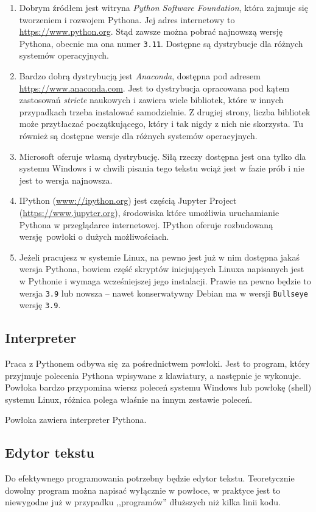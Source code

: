 \documentclass[a4paper]{article}
\begin{document}
\begin{enumerate}
  \item Dobrym źródłem jest witryna \emph{Python Software Foundation}, która zajmuje się tworzeniem i rozwojem Pythona. Jej adres internetowy to \url{https://www.python.org}. Stąd zawsze można pobrać najnowszą wersję Pythona, obecnie ma ona numer \texttt{3.11}. Dostępne są dystrybucje dla różnych systemów operacyjnych.
  \item Bardzo dobrą dystrybucją jest \emph{Anaconda}, dostępna pod adresem \url{https://www.anaconda.com}. Jest to dystrybucja opracowana pod kątem zastosowań \emph{stricte} naukowych i zawiera wiele bibliotek, które w innych przypadkach trzeba instalować samodzielnie. Z drugiej strony, liczba bibliotek może przytłaczać początkującego, który i tak nigdy z nich nie skorzysta. Tu również są dostępne wersje dla różnych systemów operacyjnych.
  \item Microsoft oferuje własną dystrybucję. Siłą rzeczy dostępna jest ona tylko dla systemu Windows i w chwili pisania tego tekstu wciąż jest w fazie prób i nie jest to wersja najnowsza.
  \item IPython (\url{www://ipython.org}) jest częścią Jupyter Project (\url{https://www.jupyter.org}), środowiska które umożliwia uruchamianie Pythona w przeglądarce internetowej. IPython oferuje rozbudowaną wersję powłoki o dużych możliwościach.
  \item Jeżeli pracujesz w systemie Linux, na pewno jest już w nim dostępna jakaś wersja Pythona, bowiem część skryptów inicjujących Linuxa napisanych jest w Pythonie i wymaga wcześniejszej jego instalacji. Prawie na pewno będzie to wersja \texttt{3.9} lub nowsza -- nawet konserwatywny Debian ma w wersji \texttt{Bullseye} wersję \texttt{3.9}.

\end{enumerate}

\subsection{Interpreter}

Praca z Pythonem odbywa się za pośrednictwem powłoki. Jest to program, który przyjmuje polecenia Pythona wpisywane z klawiatury, a następnie je wykonuje. Powłoka bardzo przypomina wiersz poleceń systemu Windows lub powłokę (shell) systemu Linux, różnica polega właśnie na innym zestawie poleceń.

Powłoka zawiera interpreter Pythona.

\subsection{Edytor tekstu}
Do efektywnego programowania potrzebny będzie edytor tekstu. Teoretycznie dowolny program można napisać wyłącznie w powłoce, w praktyce jest to niewygodne już w przypadku ,,programów'' dłuższych niż kilka linii kodu.
\end{document}
